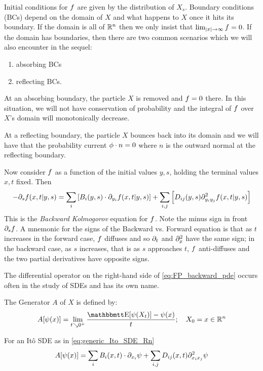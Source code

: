 Initial conditions for ${f}$ are given by the distribution of $X_s$. 
Boundary conditions (BCs) depend
on the domain of $X$ and what happens to $X$ once it hits its boundary. If the domain
is all of ${ \mathbb{R} }^n$ then we only insist that $\lim_{|x| {\rightarrow} \infty} {f} = 0$. If the
domain has boundaries, then there are two common scenarios which we will also
encounter in the sequel:
\begin{enumerate}  
  \item absorbing BCs
  \item reflecting BCs.
\end{enumerate}
At an absorbing boundary, the particle $X$ is removed and ${f}=0$ there.
In this situation, we will not have conservation of probability and the integral
of ${f}$ over $X$'s domain will monotonically decrease.

At a reflecting boundary, the particle $X$ bounces back into its domain and we
will have that the probability current ${ \phi }\cdot n = 0$ where $n$ is the outward
normal at the reflecting boundary.

Now consider ${f}$ as a function of the initial values $y,s$, holding the
terminal values $x,t$ fixed. Then
\begin{equation}
-{\partial}_s {f}(x,t|y,s)= \sum_i  \left[B_i(y,s) \cdot {\partial}_{y_i}{f}(x,t|y,s) \right] 
+ \sum_{i,j}   \left[ D_{ij}(y,s) {\partial}^2_{y_i y_j}{f}(x,t|y,s) \right]
\label{eq:FP_backward_pde}
\end{equation} 
This is the \emph{Backward Kolmogorov} equation for ${f}$. Note the minus sign
in front ${\partial}_s {f}$. A mnemonic for the signs of the Backward vs. Forward
equation is that as $t$ increases in the forward case, ${f}$ diffuses and so ${\partial}_t$ and ${\partial}^2_{x}$
have the same sign; in the backward case, as $s$ increases, that is as $s$ approaches $t$, ${f}$
anti-diffuses and the two partial derivatives have opposite signs. 
  
The differential operator on the right-hand side of
\cref{eq:FP_backward_pde} occurs often in the study of SDEs and has its own
name.
\begin{defn} The Generator $A$ of $X$ is defined by:
$$
A[\psi(x)] = \lim_{t \searrow 0^+} \frac{\Exp[\psi(X_t)]  - \psi(x)}{t} ;  \quad X_0 =
x \in \R^n
$$
\end{defn} 
\begin{lemma} For an It\^o SDE as in \cref{eq:generic_Ito_SDE_Rn} 
$$
A[\psi(x)] = \sum_i B_i(x,t) \cdot {\partial}_{x_i} \psi + \sum_{i,j} D_{ij}(x,t)
{\partial}^2_{x_i x_j}\psi $$
\end{lemma}


